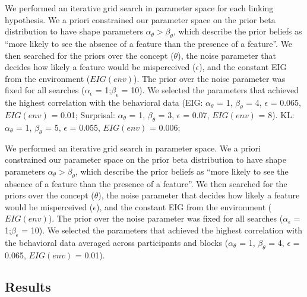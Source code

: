 \documentclass[10pt, letterpaper]{article}
\begin{document}
We performed an iterative grid search in parameter space for each
linking hypothesis. We a priori constrained our parameter space on the
prior beta distribution to have shape parameters
\(\alpha_{\theta} > \beta_{\theta}\), which describe the prior beliefs
as ``more likely to see the absence of a feature than the presence of a
feature''. We then searched for the priors over the concept
(\(\theta\)), the noise parameter that decides how likely a feature
would be misperceived (\(\epsilon\)), and the constant EIG from the
environment (\(EIG(env)\)). The prior over the noise parameter was fixed
for all searches (\(\alpha_{\epsilon}\) = 1;\(\beta_{\epsilon}\) = 10).
We selected the parameters that achieved the highest correlation with
the behavioral data (EIG: \(\alpha_{\theta}\) = 1, \(\beta_{\theta}\) =
4, \(\epsilon\) = 0.065, \(EIG(env)\) = 0.01; Surprisal:
\(\alpha_{\theta}\) = 1, \(\beta_{\theta}\) = 3, \(\epsilon\) = 0.07,
\(EIG(env)\) = 8). KL: \(\alpha_{\theta}\) = 1, \(\beta_{\theta}\) = 5,
\(\epsilon\) = 0.055, \(EIG(env)\) = 0.006;

We performed an iterative grid search in parameter space. We a priori
constrained our parameter space on the prior beta distribution to have
shape parameters \(\alpha_{\theta} > \beta_{\theta}\), which describe
the prior beliefs as ``more likely to see the absence of a feature than
the presence of a feature''. We then searched for the priors over the
concept (\(\theta\)), the noise parameter that decides how likely a
feature would be misperceived (\(\epsilon\)), and the constant EIG from
the environment (\(EIG(env)\)). The prior over the noise parameter was
fixed for all searches (\(\alpha_{\epsilon}\) = 1;\(\beta_{\epsilon}\) =
10). We selected the parameters that achieved the highest correlation
with the behavioral data averaged across participants and blocks
(\(\alpha_{\theta}\) = 1, \(\beta_{\theta}\) = 4, \(\epsilon\) = 0.065,
\(EIG(env)\) = 0.01).

\hypertarget{results-1}{%
\subsection{Results}\label{results-1}}
\end{document}
